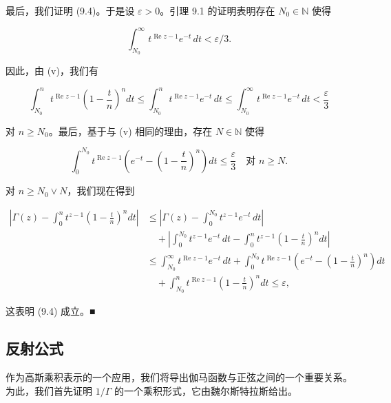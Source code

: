 \begin{theorem}
\begin{subitems}
\item

最后，我们证明 (9.4)。于是设 $ \varepsilon > 0 $。引理 9.1 的证明表明存在 $ N_0 \in \mathbb{N} $ 使得

\[
\int_{N_0}^{\infty} t^{\operatorname{Re} z-1} e^{-t} \, dt < \varepsilon/3 .
\]

因此，由 (v)，我们有

\[
\int_{N_0}^{n} t^{\operatorname{Re} z-1} \left( 1 - \frac{t}{n} \right)^{n} dt \le \int_{N_0}^{n} t^{\operatorname{Re} z-1} e^{-t} \, dt \le \int_{N_0}^{\infty} t^{\operatorname{Re} z-1} e^{-t} \, dt < \frac{\varepsilon}{3}
\]

对 $ n \ge N_0 $。最后，基于与 (v) 相同的理由，存在 $ N \in \mathbb{N} $ 使得

\[
\int_{0}^{N_0} t^{\operatorname{Re} z-1} \left( e^{-t} - \left( 1 - \frac{t}{n} \right)^{n} \right) dt \le \frac{\varepsilon}{3} \quad \text{对 } n \ge N .
\]

对 $ n \ge N_0 \lor N $，我们现在得到

\begin{equation*}
\begin{aligned}
\left| \Gamma(z) - \int_{0}^{n} t^{z-1} \left( 1 - \frac{t}{n} \right)^{n} dt \right| &\le \left| \Gamma(z) - \int_{0}^{N_0} t^{z-1} e^{-t} \, dt \right| \\
&\quad + \left| \int_{0}^{N_0} t^{z-1} e^{-t} \, dt - \int_{0}^{n} t^{z-1} \left( 1 - \frac{t}{n} \right)^{n} dt \right| \\ &\le \int_{N_0}^{\infty} t^{\operatorname{Re} z-1} e^{-t} \, dt + \int_{0}^{N_0} t^{\operatorname{Re} z-1} \left( e^{-t} - \left( 1 - \frac{t}{n} \right)^{n} \right) dt \\ &\quad + \int_{N_0}^{n} t^{\operatorname{Re} z-1} \left( 1 - \frac{t}{n} \right)^{n} dt \le \varepsilon ,
\end{aligned}
\end{equation*}

这表明 (9.4) 成立。\nobreak\hspace{0.35em}■

\end{subitems}

\end{theorem}

\subsection*{反射公式}

作为高斯乘积表示的一个应用，我们将导出伽马函数与正弦之间的一个重要关系。为此，我们首先证明 $ 1/\Gamma $ 的一个乘积形式，它由魏尔斯特拉斯给出。

